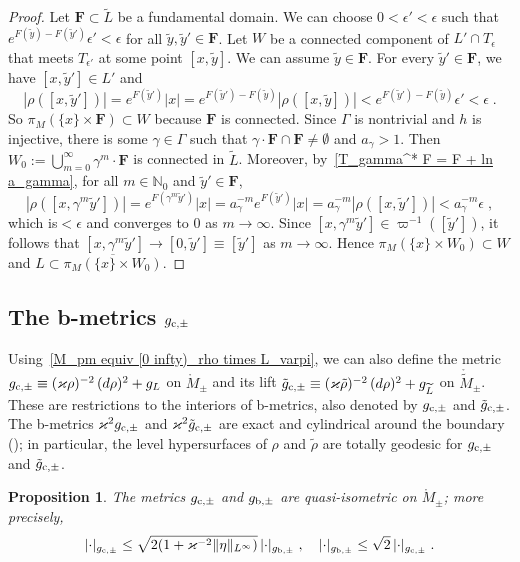 \documentclass{memo-l}
\theoremstyle{plain}
\newtheorem{prop}[thm]{Proposition}
\theoremstyle{definition}
\theoremstyle{remark}
\newcommand{\N}{\mathbb{N}}
\newcommand{\bfF}{\boldsymbol{F}}
\numberwithin{section}{chapter}
\numberwithin{equation}{section}%
\begin{document}
\begin{proof}
Let $\bfF\subset\widetilde L$ be a fundamental domain. We can choose $0<\epsilon'<\epsilon$ such that $e^{F(\tilde y)-F(\tilde y')}\epsilon'<\epsilon$ for all $\tilde y,\tilde y'\in\bfF$. Let $W$ be a connected component of $L'\cap T_\epsilon$ that meets $T_{\epsilon'}$ at some point $[x,\tilde y]$. We can assume $\tilde y\in\bfF$. For every $\tilde y'\in\bfF$, we have $[x,\tilde y']\in L'$ and
\[
|\rho([x,\tilde y'])|=e^{F(\tilde y')}|x|=e^{F(\tilde y')-F(\tilde y)}|\rho([x,\tilde y])|<e^{F(\tilde y')-F(\tilde y)}\epsilon'<\epsilon\;.
\]
So $\pi_M(\{x\}\times\bfF)\subset W$ because $\bfF$ is connected. Since $\Gamma$ is nontrivial and $h$ is injective, there is some $\gamma\in\Gamma$ such that $\gamma\cdot\bfF\cap\bfF\ne\emptyset$ and $a_\gamma>1$. Then $W_0:=\bigcup_{m=0}^\infty\gamma^m\cdot\bfF$ is connected in $\widetilde L$. Moreover, by~\eqref{T_gamma^* F = F + ln a_gamma}, for all $m\in\N_0$ and $\tilde y'\in\bfF$,
\[
|\rho([x,\gamma^m\tilde y'])|=e^{F(\gamma^m\tilde y')}|x|=a_\gamma^{-m}e^{F(\tilde y')}|x|=a_\gamma^{-m}|\rho([x,\tilde y'])|<a_\gamma^{-m}\epsilon\;,
\]
which is${}<\epsilon$ and converges to $0$ as $m\to\infty$. Since $[x,\gamma^m\tilde y']\in\varpi^{-1}([\tilde y'])$, it follows that $[x,\gamma^m\tilde y']\to[0,\tilde y']\equiv[\tilde y']$ as $m\to\infty$. Hence $\pi_M(\{x\}\times W_0)\subset W$ and $L\subset\overline{\pi_M(\{x\}\times W_0)}$.
\end{proof} 


\subsection{The b-metrics $g_{\text{\rm c},\pm}$}\label{ss: g_c pm}

Using~\eqref{M_pm equiv [0 infty)_rho times L_varpi}, we can also define the metric $g_{\text{\rm c},\pm}\equiv(\varkappa\rho)^{-2}\,(d\rho)^2+g_L$ on $\mathring M_\pm$ and its lift $\tilde g_{\text{\rm c},\pm}\equiv(\varkappa\tilde\rho)^{-2}\,(d\rho)^2+g_{\widetilde L}$ on $\mathring{\widetilde M}_\pm$. These are restrictions to the interiors of b-metrics, also denoted by $g_{\text{\rm c},\pm}$ and $\tilde g_{\text{\rm c},\pm}$. The b-metrics $\varkappa^2g_{\text{\rm c},\pm}$ and $\varkappa^2\tilde g_{\text{\rm c},\pm}$ are exact and cylindrical around the boundary (); in particular, the level hypersurfaces of $\rho$ and $\tilde\rho$ are totally geodesic for $g_{\text{\rm c},\pm}$ and $\tilde g_{\text{\rm c},\pm}$.

\begin{prop}\label{p: g_c pm & g_pm are quasi-isometric}
The metrics $g_{\text{\rm c},\pm}$ and $g_{\text{\rm b},\pm}$ are quasi-isometric on $\mathring M_\pm$; more precisely, 
\[
|{\cdot}|_{g_{\text{\rm c},\pm}}\le\sqrt{2(1+\varkappa^{-2}\|\eta\|_{L^\infty})}\,|{\cdot}|_{g_{\text{\rm b},\pm}}\;,\quad
|{\cdot}|_{g_{\text{\rm b},\pm}}\le \sqrt2\,|{\cdot}|_{g_{\text{\rm c},\pm}}\;.
\]
\end{prop}
\end{document}
